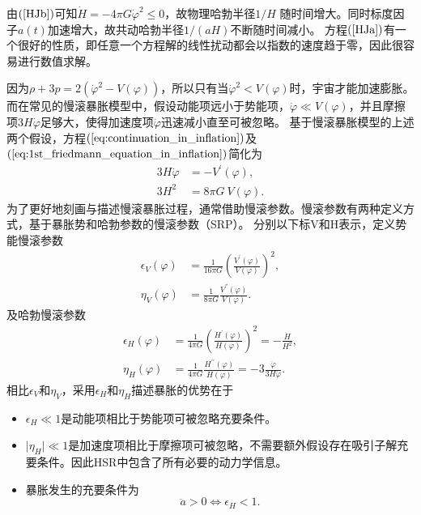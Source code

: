 由$(\ref{HJb})$可知$\dot H=-4\pi G\dot \varphi^2\leq 0$，故物理哈勃半径$1/H$
随时间增大。同时标度因子$a(t)$加速增大，故共动哈勃半径$1/(aH)$不断随时间减小。
方程$(\ref{HJa})$有一个很好的性质，即任意一个方程解的线性扰动都会以指数的速度趋于零，因此很容易进行数值求解。

因为$\rho+3p=2{(\dot{\varphi}^2-V(\varphi))}$，所以只有当$\dot{\varphi}^2<V(\varphi)$时，宇宙才能加速膨胀。
而在常见的慢滚暴胀模型中，假设动能项远小于势能项，$\dot{\varphi}\ll
V(\varphi)$，并且摩擦项$3H\dot{\varphi}$足够大，使得加速度项$\ddot{\varphi}$迅速减小直至可被忽略。
基于慢滚暴胀模型的上述两个假设，方程$(\ref{eq:continuation_in_inflation})$及$(\ref{eq:1st_friedmann_equation_in_inflation})$简化为
\begin{align}
  \label{eq:friedmann_equation_in_slow_roll_inflation}
  3H\dot{\varphi} &= -V^\prime(\varphi), \\
  3H^2&=8\pi G\ V(\varphi).
\end{align}
为了更好地刻画与描述慢滚暴胀过程，通常借助慢滚参数。慢滚参数有两种定义方式，基于暴胀势和哈勃参数的慢滚参数（SRP）。
分别以下标V和H表示，定义势能慢滚参数
\begin{align}
  \label{eq:PSRA_epsilon}
  \epsilon_V(\varphi) &= \frac{1}{16\pi G}
  {\left(\frac{V^\prime(\varphi)}{V(\varphi)}\right)}^2,
  \\
  \label{eq:PSRA_eta}
  \eta_V(\varphi) &= \frac{1}{8\pi G}\frac{V^{\dprime}(\varphi)}{V(\varphi)}.
\end{align}
及哈勃慢滚参数
\begin{align}
  \label{eq:HSRA_epsilon}
  \epsilon_H(\varphi) &= \frac{1}{4\pi G}
  {\left(\frac{H^{\prime}(\varphi)}{H(\varphi)}\right)}^2=-\frac{\dot{H}}{H^2}, \\
  \label{eq:HSRA_eta}
  \eta_H(\varphi) &= \frac{1}{4\pi G} \frac{H^{\prime\prime}(\varphi)}{H(\varphi)}=-3
  \frac{\ddot{\varphi}}{3H\dot{\varphi}}.
\end{align}
相比$\epsilon_V$和$\eta_V$，采用$\epsilon_H$和$\eta_H$描述暴胀的优势在于
\begin{itemize}
  \item $\epsilon_H\ll 1$是动能项相比于势能项可被忽略充要条件。\\
  \item $\lvert \eta_H\rvert \ll
    1$是加速度项相比于摩擦项可被忽略，不需要额外假设存在吸引子解充要条件。因此HSR中包含了所有必要的动力学信息。 \\
  \item 暴胀发生的充要条件为
    \begin{equation}
      \ddot{a} > 0 \Longleftrightarrow \epsilon_H < 1. 
    \end{equation}
\end{itemize}



